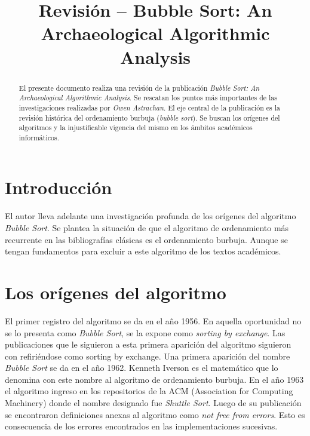 \documentclass[conference]{IEEEtran}
\begin{document}
%
\title{Revisión -- Bubble Sort: An Archaeological Algorithmic Analysis}


\author{
}

\maketitle


\begin{abstract}
El presente documento realiza una revisión de la publicación
\emph{Bubble Sort: An Archaeological Algorithmic Analysis}\cite{Astrachan}. Se
rescatan los puntos más importantes de las investigaciones realizadas
por \emph{Owen Astrachan}. El eje central de la publicación es la
revisión histórica del ordenamiento burbuja (\emph{bubble
  sort}). Se buscan los orígenes del algoritmos y la injustificable
vigencia del mismo en los ámbitos académicos informáticos.
\end{abstract}

\IEEEpeerreviewmaketitle

\section{Introducción}
\label{sec:intro}

El autor lleva adelante una investigación profunda de los orígenes del
algoritmo \emph{Bubble Sort}. Se plantea la situación de que el
algoritmo de ordenamiento más recurrente en las bibliografías clásicas
es el ordenamiento burbuja. Aunque se tengan fundamentos para excluir
a este algoritmo de los textos académicos.

\section{Los orígenes del algoritmo}
\label{sec:origen-alg}

El primer registro del algoritmo se da en el año 1956. En aquella
oportunidad no se lo presenta como \emph{Bubble Sort}, se la expone
como \emph{sorting by exchange}. Las publicaciones que le siguieron a
esta primera aparición del algoritmo siguieron con refiriéndose como
sorting by exchange. 
Una primera aparición del nombre \emph{Bubble Sort} se da en el año
1962.  Kenneth Iverson es el matemático que lo denomina con este
nombre al algoritmo de ordenamiento burbuja.
En el año 1963 el algoritmo ingreso en los repositorios de la ACM
(Association for Computing Machinery) donde el nombre designado fue
\emph{Shuttle Sort}. Luego de su publicación se encontraron
definiciones anexas al algoritmo como \emph{not free from
  errors}. Esto es consecuencia de los errores encontrados en las
implementaciones sucesivas. 
\end{document}
